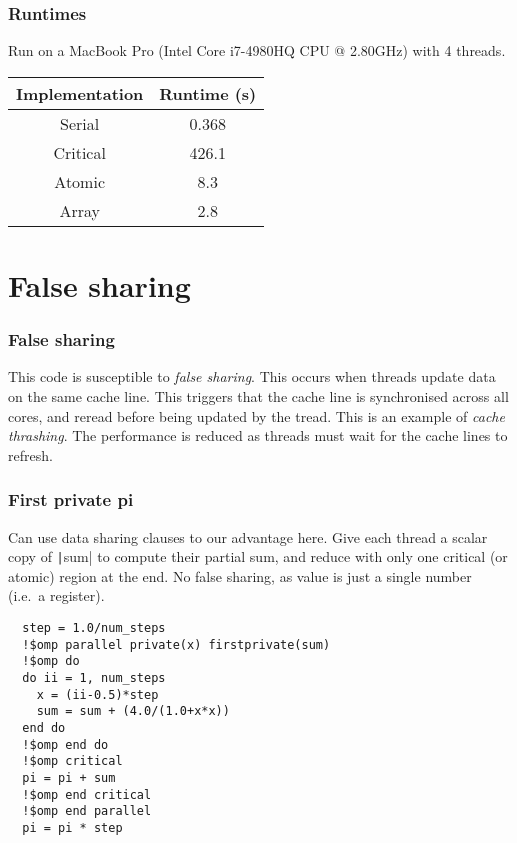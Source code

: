 \documentclass{beamer}
\begin{document}
\begin{frame}
\frametitle{Runtimes}
Run on a MacBook Pro (Intel Core i7-4980HQ CPU @ 2.80GHz) with 4 threads.

\begin{table}
\begin{tabular}{cc}
\toprule
Implementation & Runtime (s) \\
\midrule
Serial   & 0.368 \\
Critical & 426.1 \\
Atomic   & 8.3 \\
Array    & 2.8 \\
\bottomrule
\end{tabular}
\end{table}
\end{frame}

\section{False sharing}
\begin{frame}
\frametitle{False sharing}
This code is susceptible to \emph{false sharing}.
This occurs when threads update data on the same cache line.
This triggers that the cache line is synchronised across all cores, and reread before being updated by the tread.
This is an example of \emph{cache thrashing}.
The performance is reduced as threads must wait for the cache lines to refresh.
\end{frame}

\begin{frame}[fragile]
\frametitle{First private pi}
Can use data sharing clauses to our advantage here. Give each thread a scalar copy of \texttt|sum| to compute their partial sum, and reduce with only one critical (or atomic) region at the end.
No false sharing, as value is just a single number (i.e.\ a register).
\begin{verbatim}
  step = 1.0/num_steps
  !$omp parallel private(x) firstprivate(sum)
  !$omp do
  do ii = 1, num_steps
    x = (ii-0.5)*step
    sum = sum + (4.0/(1.0+x*x))
  end do
  !$omp end do
  !$omp critical
  pi = pi + sum
  !$omp end critical
  !$omp end parallel
  pi = pi * step
\end{verbatim}
\end{frame}
\end{document}

